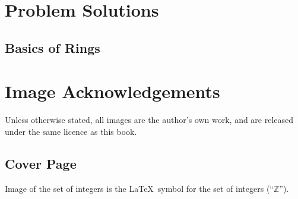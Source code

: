 \chapter{Problem Solutions}
\section{Basics of Rings}

\chapter{Image Acknowledgements}
Unless otherwise stated, all images are the author's own work, and are released under the same licence as this book.

\section{Cover Page}
Image of the set of integers is the \LaTeX\, symbol for the set of integers (``$\mathbb{Z}$'').

\printbibliography[heading=bibintoc, title={References and Bibliography}]
\printindex


